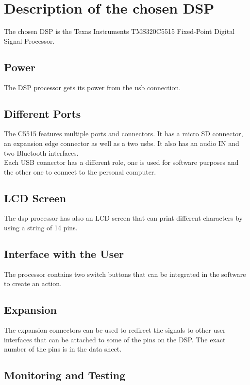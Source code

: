 \section{Description of the chosen DSP}

The chosen DSP is the Texas Instruments TMS320C5515 Fixed-Point Digital Signal Processor.

\subsection{Power}

The DSP processor gets its power from the \gls{usb} connection.

\subsection{Different Ports}

The C5515 features multiple ports and connectors. It has a micro SD connector, an expansion edge connector as well as a two \gls{usb}s. It also has an audio IN and two Bluetooth interfaces. \\

Each USB connector has a different role, one is used for software purposes and the other one to connect to the personal computer. 

\subsection{LCD Screen}

The \gls{dsp} processor has also an LCD screen that can print different characters by using a string of 14 pins. 

\subsection{Interface with the User}

The processor contains two switch buttons that can be integrated in the software to create an action. 

\subsection{Expansion}

The expansion connectors can be used to redirect the signals to other user interfaces that can be attached to some of the pins on the DSP. The exact number of the pins is in the data sheet. 

\subsection{Monitoring and Testing}

